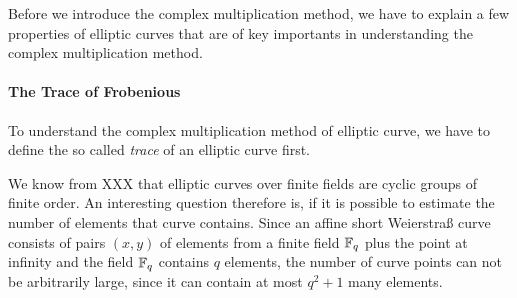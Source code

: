 Before we introduce the complex multiplication method, we have to explain a few properties of elliptic curves that are of key importants in understanding the complex multiplication method. 
\paragraph{The Trace of Frobenious} To understand the complex multiplication method of elliptic curve, we have to define the so called \textit{trace} of an elliptic curve first.

We know from XXX that elliptic curves over finite fields are cyclic groups of finite order. An interesting question therefore is, if it is possible to estimate the number of elements that curve contains. Since an affine short Weierstraß curve consists of pairs $(x,y)$ of elements from a finite field $\mathbb{F}_q$ plus the point at infinity and the field $\mathbb{F}_q$ contains $q$ elements, the number of curve points can not be arbitrarily large, since it can contain at most $q^2+1$ many elements. 

